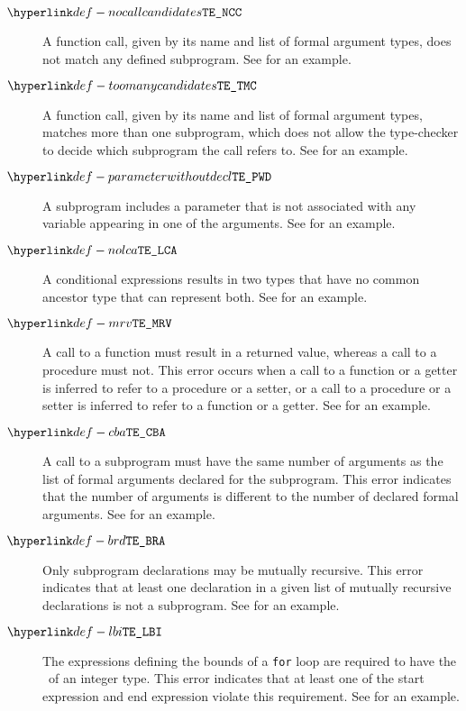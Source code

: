 \begin{description}
\hypertarget{def-nocallcandidates}{}
\item[$\NoCallCandidates$]
A function call, given by its name and list of formal argument types, does not match any defined subprogram.
See  for an example.

\hypertarget{def-toomanycandidates}{}
\item[$\TooManyCandidates$]
A function call, given by its name and list of formal argument types, matches more than one subprogram,
which does not allow the type-checker to decide which subprogram the call refers to.
See  for an example.

\hypertarget{def-parameterwithoutdecl}{}
\item[$\ParameterWithoutDecl$]
A subprogram includes a parameter that is not associated with any variable appearing in one of the arguments.
See  for an example.

\hypertarget{def-nolca}{}
\item[$\NoLCA$]
A conditional expressions results in two types that have no common ancestor type that can represent both.
See  for an example.

\hypertarget{def-mrv}{}
\item[$\MismatchedReturnValue$]
A call to a function must result in a returned value,
whereas a call to a procedure must not.
This error occurs when a call to a function or a getter is inferred to refer to a procedure or a setter,
or a call to a procedure or a setter is inferred to refer to a function or a getter.
See  for an example.

\hypertarget{def-cba}{}
\item[$\CallBadArity$]
A call to a subprogram must have the same number of arguments as the list of formal arguments
declared for the subprogram.
This error indicates that the number of arguments is different to the number of declared formal arguments.
See  for an example.

\hypertarget{def-brd}{}
\item[$\BadRecursiveDecls$]
Only subprogram declarations may be mutually recursive.
This error indicates that at least one declaration in a given list of mutually recursive declarations
is not a subprogram.
See  for an example.

\hypertarget{def-lbi}{}
\item[$\RequireIntegerForLoopBounds$]
The expressions defining the bounds of a \texttt{for} loop are required to have the \structure\ of
an integer type.
This error indicates that at least one of the start expression and end expression violate this
requirement.
See  for an example.


\end{description}
